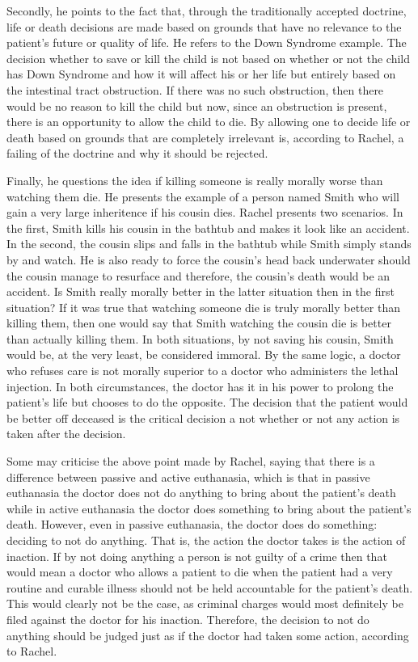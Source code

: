 \documentclass{article}
\begin{document}
Secondly, he points to the fact that, through the traditionally accepted doctrine,
life or death decisions are made based on grounds that have no relevance to the patient's
future or quality of life. He refers to the Down Syndrome example. The decision
whether to save or kill the child is not based on whether or not the child has
Down Syndrome and how it will affect his or her life but entirely based on
the intestinal tract obstruction. If there was no such obstruction, then there
would be no reason to kill the child but now, since an obstruction is present,
there is an opportunity to allow the child to die. By allowing one to decide life
or death based on grounds that are completely irrelevant is, according to Rachel,
a failing of the doctrine and why it should be rejected.

Finally, he questions the idea if killing someone is really morally worse than watching
them die. He presents the example of a person named Smith who will gain a very large
inheritence if his cousin dies. Rachel presents two scenarios. In the first, Smith
kills his cousin in the bathtub and makes it look like an accident. In the second,
the cousin slips and falls in the bathtub while Smith simply stands by and watch. He
is also ready to force the cousin's head back underwater should the cousin manage to
resurface and therefore, the cousin's death would be an accident. Is Smith really
morally better in the latter situation then in the first situation? If it was true
that watching someone die is truly morally better than killing them, then one would
say that Smith watching the cousin die is better than actually killing them.
In both situations, by not saving his cousin, Smith would be, at the very least, be
considered immoral. By the same logic, a doctor who refuses care is not morally
superior to a doctor who administers the lethal injection. In both circumstances, 
the doctor has it in his power to prolong the patient's life but chooses to do the
opposite. The decision that the patient would be better off deceased is the
critical decision a not whether or not any action is taken after the decision.

Some may criticise the above point made by Rachel, saying that there is a
difference between passive and active euthanasia, which is that in passive euthanasia
the doctor does not do anything to bring about the patient's death while in active
euthanasia the doctor does something to bring about the patient's death. However, even in passive euthanasia, the
doctor does do something: deciding to not do anything. That is, the action the doctor
takes is the action of inaction. If by not doing anything a person is not guilty of
a crime then that would mean a doctor who allows a patient to die when the patient
had a very routine and curable illness should not be held accountable for the patient's
death. This would clearly not be the case, as criminal charges would most definitely
be filed against the doctor for his inaction. Therefore, the decision to not do anything
should be judged just as if the doctor had taken some action, according to Rachel.
\end{document}
